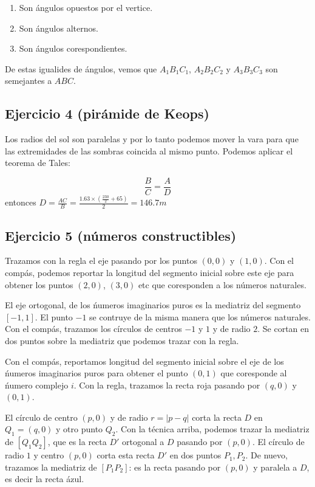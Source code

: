 \begin{enumerate}
\item Son ángulos opuestos por el vertice.
\item Son ángulos alternos.
\item Son ángulos corespondientes.
\end{enumerate}

De estas igualides de ángulos, vemos que $A_1B_1C_1$, $A_2B_2C_2$ y
$A_3B_3C_3$ son semejantes a $ABC$.

\subsection{Ejercicio 4 (pirámide de Keops)}

Los radios del sol son paralelas y por lo tanto podemos mover la vara para
que las extremidades de las sombras coincida al mismo punto. Podemos aplicar
el teorema de Tales:

$$
\frac{B}{C} = \frac{A}{D}
$$
entonces $D = \frac{A C}{B} = \frac{1.63 \times
  \left(\frac{230}{2}+65\right)}{2} = 146.7m$

\subsection{Ejercicio 5 (números constructibles)}

Trazamos con la regla el eje pasando por los puntos $(0,0)$ y $(1,0)$. Con el
compás, podemos reportar la longitud del segmento inicial sobre este eje para
obtener los puntos $(2,0)$, $(3,0)$ etc que coresponden a los números naturales.

El eje ortogonal, de los ńumeros imaginarios puros es la mediatriz del segmento
$[-1,1]$. El punto $-1$ se contruye de la misma manera que los números
naturales. Con el compás, trazamos los círculos de centros $-1$ y $1$ y de
radio $2$. Se cortan en dos puntos sobre la mediatriz que podemos trazar con
la regla.

Con el compás, reportamos longitud del segmento inicial
sobre el eje de los ńumeros imaginarios puros para obtener el punto $(0,1)$ que
coresponde al ńumero complejo $i$. Con la regla, trazamos la recta roja pasando
por $(q,0)$ y $(0,1)$.

El círculo de centro $(p,0)$ y de radio $r=|p-q|$ corta la recta $D$ en
$Q_1={(q,0)}$ y otro punto $Q_2$. Con la técnica arriba, podemos trazar la
mediatriz de $[Q_1Q_2]$, que es la recta $D'$
ortogonal a $D$ pasando por ${(p,0)}$. El círculo de radio $1$ y centro
$(p,0)$ corta esta recta $D'$ en dos puntos $P_1, P_2$. De nuevo, trazamos
la mediatriz de $[P_1P_2]$: es la recta pasando por $(p,0)$ y paralela a
$D$, es decir la recta ázul.

